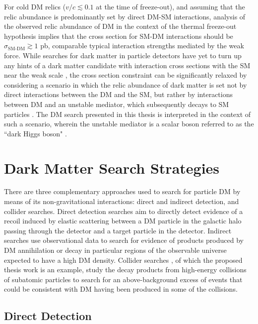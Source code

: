 For cold DM relics (\(v/c\lesssim0.1\) at the time of freeze-out), and assuming that the relic abundance is predominantly set by direct DM-SM interactions, analysis of the observed relic abundance of DM in the context of the thermal freeze-out hypothesis \cite{dm_xsec_2015} implies that the cross section for SM-DM interactions should be \(\sigma_\text{SM-DM}\gtrsim1\) pb, comparable typical interaction strengths mediated by the weak force. While searches for dark matter in particle detectors have yet to turn up any hints of a dark matter candidate with interaction cross sections with the SM near the weak scale \cite{wimp_searches_2018}, the cross section constraint can be significantly relaxed by considering a scenario in which the relic abundance of dark matter is set not by direct interactions between the DM and the SM, but rather by interactions between DM and an unstable mediator, which subsequently decays to SM particles \cite{secluded_dm_2008}. The DM search presented in this thesis is interpreted in the context of such a scenario, wherein the unstable mediator is a scalar boson referred to as the ``dark Higgs boson" \cite{Duerr_2016,Duerr2017}.

\section{Dark Matter Search Strategies}

There are three complementary approaches used to search for particle DM by means of its non-gravitational interactions: direct and indirect detection, and collider searches. Direct detection searches \cite{Schumann_2019, 2015gya, billard2021direct} aim to directly detect evidence of a recoil induced by elastic scattering between a DM particle in the galactic halo passing through the detector and a target particle in the detector. Indirect searches \cite{CIRELLI_2012, conrad} use observational data to search for evidence of products produced by DM annihilation or decay in particular regions of the observable universe expected to have a high DM density. Collider searches \cite{DM_colliders}, of which the proposed thesis work is an example, study the decay products from high-energy collisions of subatomic particles to search for an above-background excess of events that could be consistent with DM having been produced in some of the collisions.

\subsection{Direct Detection}

